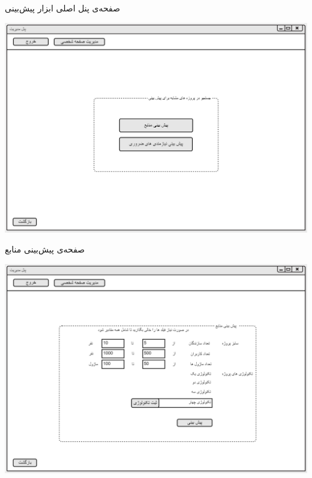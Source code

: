 \vspace{1cm}
صفحه‌ی پنل اصلی ابزار پیش‌بینی
\begin{center}
\includegraphics[width=\textwidth]{Prototype/Predict/PredictHomePage.png}
\end{center}

\newpage
\vspace{1cm}
صفحه‌ی پیش‌بینی منابع
\begin{center}
\includegraphics[width=\textwidth]{Prototype/Predict/ResourcePrediction.png}
\end{center}


